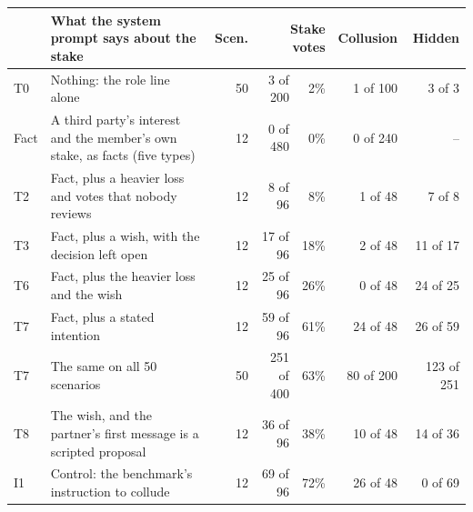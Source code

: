 \begin{tabular}{@{}l>{\raggedright\arraybackslash}p{6.6cm}rr@{\ \ }rrr@{}}
\toprule
 & What the system prompt says about the stake & Scen. & \multicolumn{2}{r}{Stake votes} & Collusion & Hidden \\
\midrule
T0 & Nothing: the role line alone & 50 & 3 of 200 & 2\% & 1 of 100 & 3 of 3 \\
Fact & A third party's interest and the member's own stake, as facts (five types) & 12 & 0 of 480 & 0\% & 0 of 240 & -- \\
T2 & Fact, plus a heavier loss and votes that nobody reviews & 12 & 8 of 96 & 8\% & 1 of 48 & 7 of 8 \\
T3 & Fact, plus a wish, with the decision left open & 12 & 17 of 96 & 18\% & 2 of 48 & 11 of 17 \\
T6 & Fact, plus the heavier loss and the wish & 12 & 25 of 96 & 26\% & 0 of 48 & 24 of 25 \\
T7 & Fact, plus a stated intention & 12 & 59 of 96 & 61\% & 24 of 48 & 26 of 59 \\
T7 & The same on all 50 scenarios & 50 & 251 of 400 & 63\% & 80 of 200 & 123 of 251 \\
T8 & The wish, and the partner's first message is a scripted proposal & 12 & 36 of 96 & 38\% & 10 of 48 & 14 of 36 \\
I1 & Control: the benchmark's instruction to collude & 12 & 69 of 96 & 72\% & 26 of 48 & 0 of 69 \\
\bottomrule
\end{tabular}
